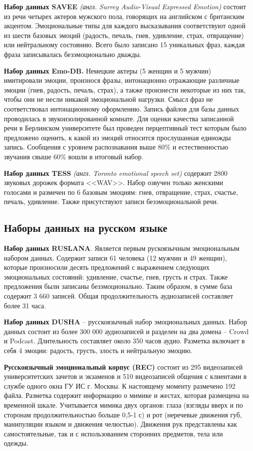 \textbf{Набор данных  SAVEE} \cite{savee} \textit{(англ. Surrey Audio-Visual Expressed Emotion)} состоит из
речи четырех актеров мужского пола, говорящих на английском с британским акцентом. Эмоциональные типы для каждого высказывания соответствуют одной из шести базовых эмоций (радость, печаль, гнев, удивление, страх, отвращение) или нейтральному состоянию. Всего было записано 15 уникальных фраз, каждая фраза записывалась безэмоционально дважды.

\textbf{Набор данных Emo-DB.} \cite{emodb} Немецкие актеры (5 женщин и 5 мужчин) имитировали эмоции, произнося фразы, интонационно отражающие различные эмоции (гнев, радость, печаль, страх), а также произнести некоторые из них так, чтобы они не несли никакой эмоциональной нагрузки. Смысл фраз не соответствовал интонационному оформлению. Запись файлов для базы данных проводилась в звукоизолированной комнате. Для оценки качества записанной речи в Берлинском университете был проведен перцептивный тест которым было предложено оценить, к какой из эмоций относится прослушанная единожды запись. Сообщения с уровнем распознавания выше 80\% и естественностью звучания свыше 60\% вошли в итоговый набор.

\textbf{Набор данных  TESS} \cite{tess} \textit{(англ. Toronto emotional speech set)} содержит 2800 звуковых дорожек формата <<WAV>>. Набор озвучен только женскими голосами и размечен по 6 базовым эмоциям: гнев, отвращение, страх, счастье, печаль, удивление. Также присутствуют записи безэмоциональной речи.
\subsection{Наборы данных на русском языке}
\textbf{Набор данных RUSLANA}. \cite{ruslana} Является первым рускоязычным эмоциональным набором данных. Содержит записи 61 человека (12 мужчин и 49 женщин), которые произносили десять предложений с выражением следующих эмоциональных состояний: удивление, счастье, гнев, грусть и страх. Также предложения были записаны безэмоционально. Таким образом, в сумме база содержит 3 660 записей. Общая продолжительность аудиозаписей составляет более 31 часа. 

\textbf{Набор данных DUSHA} \cite{dusha} -- русскоязычный набор эмоциональных данных. Набор данных состоит из более 300 000 аудиозаписей и разделен на два домена -- Crowd и Podcast. Длительность составляет около 350 часов аудио. Разметка включает в себя 4 эмоции: радость, грусть, злость и нейтральную эмоцию.

\textbf{Русскоязычный эмоциональный корпус (REC)} \cite{rec} состоит из 295 видеозаписей университетских зачетов и экзаменов и 510 видеозаписей общения с клиентами в службе одного окна ГУ ИС г. Москвы. К настоящему моменту размечено 192 файла. Разметка содержит информацию о мимике и жестах, которая размещена на временной шкале. Учитывается мимика двух органов: глаза (взгляды вверх и по сторонам продолжительностью больше 0,5-1 с) и рот (неречевые движения губ, манипуляции языком и движения челюстью). Движения рук представлены как самостоятельные, так и с использованием сторонних предметов, тела или одежды.

